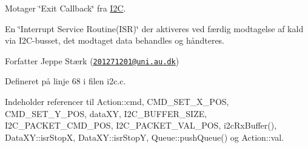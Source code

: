 Motager \char`\"{}\+Exit Callback\char`\"{} fra \hyperlink{class_i2_c}{I2C}. 

En \char`\"{}\+Interrupt Service Routine(\+I\+S\+R)\char`\"{} der aktiveres ved færdig modtagelse af kald via I2\+C-\/busset, det modtaget data behandles og håndteres.

\begin{DoxyAuthor}{Forfatter}
Jeppe Stærk (\href{mailto:201271201@uni.au.dk}{\tt 201271201@uni.\+au.\+dk}) 
\end{DoxyAuthor}


Defineret på linje 68 i filen i2c.\+c.



Indeholder referencer til Action\+::cmd, C\+M\+D\+\_\+\+S\+E\+T\+\_\+\+X\+\_\+\+P\+OS, C\+M\+D\+\_\+\+S\+E\+T\+\_\+\+Y\+\_\+\+P\+OS, data\+XY, I2\+C\+\_\+\+B\+U\+F\+F\+E\+R\+\_\+\+S\+I\+ZE, I2\+C\+\_\+\+P\+A\+C\+K\+E\+T\+\_\+\+C\+M\+D\+\_\+\+P\+OS, I2\+C\+\_\+\+P\+A\+C\+K\+E\+T\+\_\+\+V\+A\+L\+\_\+\+P\+OS, i2c\+Rx\+Buffer(), Data\+X\+Y\+::isr\+StopX, Data\+X\+Y\+::isr\+StopY, Queue\+::push\+Queue() og Action\+::val.


